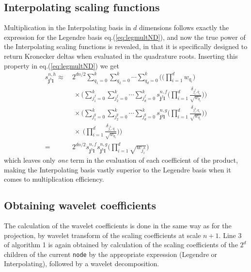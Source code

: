 \subsection*{Interpolating scaling functions}
Multiplication in the Interpolating basis in $d$ dimensions follows exactly the
expression for the Legendre basis eq.(\ref{eq:legmultND}), and now the true power 
of the Interpolating scaling functions is revealed, in that it is specifically
designed to return Kronecker deltas when evaluated in the quadrature roots.
Inserting this property in eq.(\ref{eq:legmultND}) we get
\begin{align}
	\nonumber
	s^{n,h}_{\boldsymbol{j}^h\boldsymbol{l}} 
	\approx&\ 2^{dn/2} 
	\sum_{q_1=0}^k\sum_{q_2=0}^k\cdots\sum_{q_d=0}^k\Bigg(
	\bigg(\prod_{i=1}^dw_{q_i}\bigg)\\
	\nonumber
	&\ \ \times\Bigg(\sum_{j^f_1=0}^k\sum_{j^f_2=0}^k\cdots\sum_{j^f_d=0}^k
	s^{n,f}_{\boldsymbol{j}^f\boldsymbol{l}} \bigg(
	\prod_{i=1}^d\frac{\delta_{j^f_i,q_i}}{\sqrt{w_{q_i}}}\bigg)\Bigg)\\
	\nonumber
	&\ \ \times\Bigg(\sum_{j^g_1=0}^k\sum_{j^g_2=0}^k\cdots\sum_{j^g_d=0}^k
	s^{n,g}_{\boldsymbol{j}^g\boldsymbol{l}} \bigg(
	\prod_{i=1}^d\frac{\delta_{j^g_i,q_i}}{\sqrt{w_{q_i}}}\bigg)\Bigg)\\
	\nonumber
	&\ \ \times\ 
	\bigg(\prod_{i=1}^d\frac{\delta_{j^h_i,q_i}}{\sqrt{w_{q_i}}}\bigg)\Bigg)\\
	=&\ 2^{dn/2} 
	s^{n,f}_{\boldsymbol{j}^h\boldsymbol{l}}
	s^{n,g}_{\boldsymbol{j}^h\boldsymbol{l}}
	\bigg(\prod_{i=1}^d\sqrt{w_{j^h_i}}\bigg)	
	\label{eq:intmultND}
\end{align}
which leaves only \emph{one} term in the evaluation of each coefficient of the
product, making the Interpolating basis vastly superior to the Legendre basis
when it comes to multiplication efficiency.

\subsection*{Obtaining wavelet coefficients}
The calculation of the wavelet coefficients is done in the same way as for the
projection, by wavelet transform of the scaling coefficients at scale $n+1$.
Line 3 of algorithm 1 is again obtained by calculation of the scaling
coefficients of the $2^d$ children of the current \texttt{node} by the
appropriate expression (Legendre or Interpolating), followed by a wavelet
decomposition.

